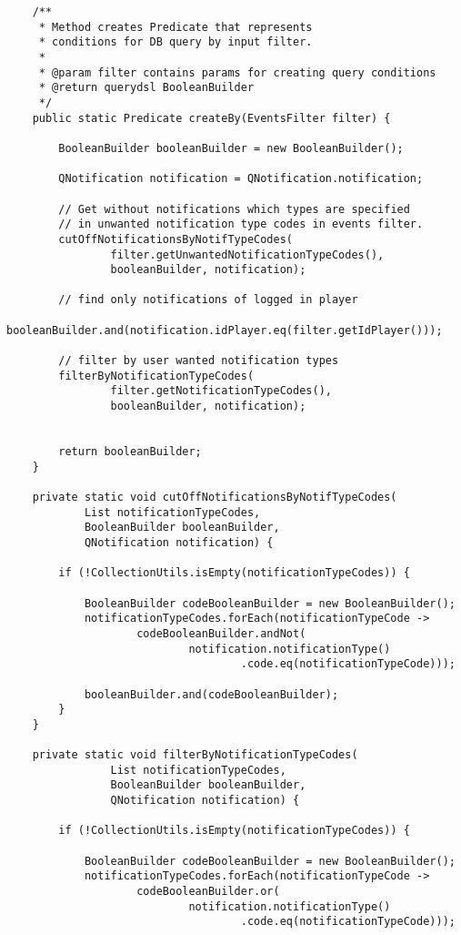 \documentclass[12pt]{article}
\begin{document}
{\begin{lstlisting}
    /**
     * Method creates Predicate that represents
     * conditions for DB query by input filter.
     *
     * @param filter contains params for creating query conditions
     * @return querydsl BooleanBuilder
     */
    public static Predicate createBy(EventsFilter filter) {

        BooleanBuilder booleanBuilder = new BooleanBuilder();

        QNotification notification = QNotification.notification;

        // Get without notifications which types are specified
        // in unwanted notification type codes in events filter.
        cutOffNotificationsByNotifTypeCodes(
                filter.getUnwantedNotificationTypeCodes(),
                booleanBuilder, notification);

        // find only notifications of logged in player
        booleanBuilder.and(notification.idPlayer.eq(filter.getIdPlayer()));

        // filter by user wanted notification types
        filterByNotificationTypeCodes(
                filter.getNotificationTypeCodes(),
                booleanBuilder, notification);


        return booleanBuilder;
    }

    private static void cutOffNotificationsByNotifTypeCodes(
            List notificationTypeCodes,
            BooleanBuilder booleanBuilder,
            QNotification notification) {

        if (!CollectionUtils.isEmpty(notificationTypeCodes)) {

            BooleanBuilder codeBooleanBuilder = new BooleanBuilder();
            notificationTypeCodes.forEach(notificationTypeCode ->
                    codeBooleanBuilder.andNot(
                            notification.notificationType()
                                    .code.eq(notificationTypeCode)));

            booleanBuilder.and(codeBooleanBuilder);
        }
    }

    private static void filterByNotificationTypeCodes(
                List notificationTypeCodes,
                BooleanBuilder booleanBuilder,
                QNotification notification) {

        if (!CollectionUtils.isEmpty(notificationTypeCodes)) {

            BooleanBuilder codeBooleanBuilder = new BooleanBuilder();
            notificationTypeCodes.forEach(notificationTypeCode ->
                    codeBooleanBuilder.or(
                            notification.notificationType()
                                    .code.eq(notificationTypeCode)));


\end{lstlisting}}
\end{document}
